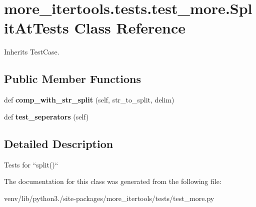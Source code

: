 \hypertarget{classmore__itertools_1_1tests_1_1test__more_1_1_split_at_tests}{}\section{more\+\_\+itertools.\+tests.\+test\+\_\+more.\+Split\+At\+Tests Class Reference}
\label{classmore__itertools_1_1tests_1_1test__more_1_1_split_at_tests}


Inherits Test\+Case.

\subsection*{Public Member Functions}
\begin{DoxyCompactItemize}
\item 
\mbox{\label{classmore__itertools_1_1tests_1_1test__more_1_1_split_at_tests_a223b421e866553b762ca42d6cc963ecc}} 
def {\bfseries comp\+\_\+with\+\_\+str\+\_\+split} (self, str\+\_\+to\+\_\+split, delim)
\item 
\mbox{\label{classmore__itertools_1_1tests_1_1test__more_1_1_split_at_tests_aea3a1c01685080f8a04ee5951639251a}} 
def {\bfseries test\+\_\+seperators} (self)
\end{DoxyCompactItemize}


\subsection{Detailed Description}
\begin{DoxyVerb}Tests for ``split()``\end{DoxyVerb}
 

The documentation for this class was generated from the following file\+:\begin{DoxyCompactItemize}
\item 
venv/lib/python3./site-\/packages/more\+\_\+itertools/tests/test\+\_\+more.\+py\end{DoxyCompactItemize}
